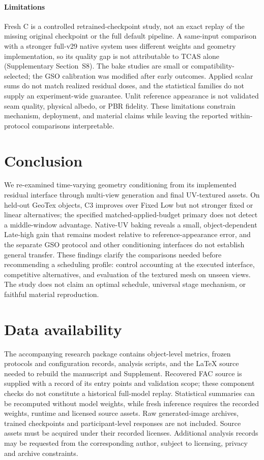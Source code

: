 \documentclass[times,twocolumn,final]{elsarticle}
\begin{document}
\paragraph{Limitations}
Fresh C is a controlled retrained-checkpoint study, not an exact replay of the missing original checkpoint or the full default pipeline. A same-input comparison with a stronger full-v29 native system uses different weights and geometry implementation, so its quality gap is not attributable to TCAS alone (Supplementary Section~S8). The bake studies are small or compatibility-selected; the GSO calibration was modified after early outcomes. Applied scalar sums do not match realized residual doses, and the statistical families do not supply an experiment-wide guarantee. Unlit reference appearance is not validated seam quality, physical albedo, or PBR fidelity. These limitations constrain mechanism, deployment, and material claims while leaving the reported within-protocol comparisons interpretable.

\section{Conclusion}
\label{sec:conclusion}

We re-examined time-varying geometry conditioning from its implemented residual interface through multi-view generation and final UV-textured assets. On held-out GeoTex objects, C3 improves over Fixed Low but not stronger fixed or linear alternatives; the specified matched-applied-budget primary does not detect a middle-window advantage. Native-UV baking reveals a small, object-dependent Late-high gain that remains modest relative to reference-appearance error, and the separate GSO protocol and other conditioning interfaces do not establish general transfer. These findings clarify the comparisons needed before recommending a scheduling profile: control accounting at the executed interface, competitive alternatives, and evaluation of the textured mesh on unseen views. The study does not claim an optimal schedule, universal stage mechanism, or faithful material reproduction.

\section*{Data availability}

The accompanying research package contains object-level metrics, frozen protocols and configuration records, analysis scripts, and the LaTeX source needed to rebuild the manuscript and Supplement. Recovered FAC source is supplied with a record of its entry points and validation scope; these component checks do not constitute a historical full-model replay. Statistical summaries can be recomputed without model weights, while fresh inference requires the recorded weights, runtime and licensed source assets. Raw generated-image archives, trained checkpoints and participant-level responses are not included. Source assets must be acquired under their recorded licenses. Additional analysis records may be requested from the corresponding author, subject to licensing, privacy and archive constraints.
\end{document}
